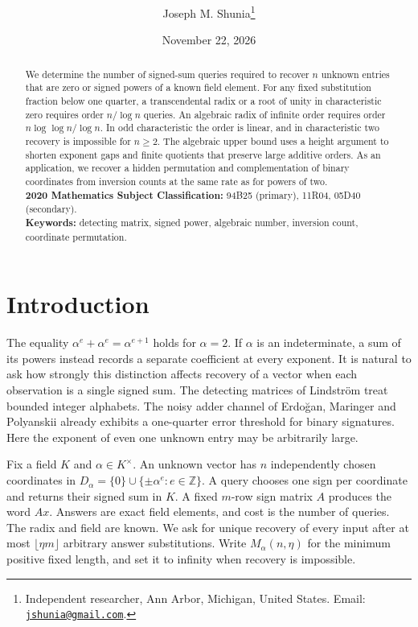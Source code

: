 \documentclass[11pt,letterpaper]{article}
\title{\vspace{-1.5\baselineskip}%
  \manuscripttitle}
\author{Joseph M. Shunia\thanks{Independent researcher, Ann Arbor, Michigan, United States.
  Email: \href{mailto:jshunia@gmail.com}{\texttt{jshunia@gmail.com}}.}}
\date{November 22, 2026}
\newcommand{\manuscriptkeywords}{detecting matrix, signed power, algebraic number, inversion count, coordinate permutation}
\numberwithin{equation}{section}
\begin{document}
\maketitle
\vspace{-\baselineskip}

\begin{abstract}
We determine the number of signed-sum queries required to recover $n$ unknown entries that are
zero or signed powers of a known field element. For any fixed substitution fraction below one
quarter, a transcendental radix or a root of unity in characteristic zero requires order
$n/\log n$ queries. An algebraic radix of infinite order requires order $n\log\log n/\log n$.
In odd characteristic the order is linear, and in characteristic two recovery is impossible
for $n\ge2$. The algebraic upper bound uses a height argument to shorten exponent gaps and
finite quotients that preserve large additive orders. As an application, we recover a hidden
permutation and complementation of binary coordinates from inversion counts at the same rate
as for powers of two.
\\[2mm]
{\bf 2020 Mathematics Subject Classification:} 94B25 (primary), 11R04, 05D40 (secondary).
\\[2mm]
{\bf Keywords:} \manuscriptkeywords.
\end{abstract}

\section{Introduction}\label{sec:intro}

The equality $\alpha^e+\alpha^e=\alpha^{e+1}$ holds for $\alpha=2$. If $\alpha$ is an
indeterminate, a sum of its powers instead records a separate coefficient at every exponent.
It is natural to ask how strongly this distinction affects recovery of a vector when each
observation is a single signed sum. The detecting matrices of Lindstr\"om \cite{lindstrom}
treat bounded integer alphabets. The noisy adder channel of Erdo\u{g}an, Maringer and
Polyanskii \cite{emp} already exhibits a one-quarter error threshold for binary signatures.
Here the exponent of even one unknown entry may be arbitrarily large.

Fix a field $K$ and $\alpha\in K^\times$. An unknown vector has $n$ independently chosen
coordinates in $D_\alpha=\{0\}\cup\{\pm\alpha^e:e\in\mathbb Z\}$. A query chooses one sign per
coordinate and returns their signed sum in $K$. A fixed $m$-row sign matrix $A$ produces the
word $Ax$. Answers are exact field elements, and cost is the number of queries. The radix and
field are known. We ask for unique recovery of every input after at most $\lfloor\eta
m\rfloor$ arbitrary answer substitutions. Write $M_\alpha(n,\eta)$ for the minimum positive
fixed length, and set it to infinity when recovery is impossible.
\end{document}
